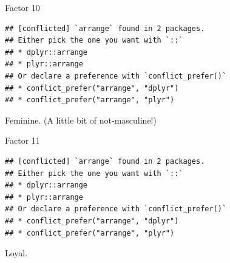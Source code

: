\documentclass[ignorenonframetext,]{beamer}
\newenvironment{Shaded}{\begin{snugshade}}{\end{snugshade}}
\newcommand{\DecValTok}[1]{\textcolor[rgb]{0.00,0.00,0.81}{#1}}
\newcommand{\KeywordTok}[1]{\textcolor[rgb]{0.13,0.29,0.53}{\textbf{#1}}}
\newcommand{\NormalTok}[1]{#1}
\newcommand{\OperatorTok}[1]{\textcolor[rgb]{0.81,0.36,0.00}{\textbf{#1}}}
\newcommand{\StringTok}[1]{\textcolor[rgb]{0.31,0.60,0.02}{#1}}
\begin{document}
\begin{frame}[fragile]{Factor 10}
\protect\hypertarget{factor-10}{}

\begin{Shaded}
\end{Shaded}

\begin{verbatim}
## [conflicted] `arrange` found in 2 packages.
## Either pick the one you want with `::` 
## * dplyr::arrange
## * plyr::arrange
## Or declare a preference with `conflict_prefer()`
## * conflict_prefer("arrange", "dplyr")
## * conflict_prefer("arrange", "plyr")
\end{verbatim}

Feminine. (A little bit of not-masculine!)

\end{frame}

\begin{frame}[fragile]{Factor 11}
\protect\hypertarget{factor-11}{}

\begin{Shaded}
\end{Shaded}

\begin{verbatim}
## [conflicted] `arrange` found in 2 packages.
## Either pick the one you want with `::` 
## * dplyr::arrange
## * plyr::arrange
## Or declare a preference with `conflict_prefer()`
## * conflict_prefer("arrange", "dplyr")
## * conflict_prefer("arrange", "plyr")
\end{verbatim}

Loyal.

\end{frame}
\end{document}
